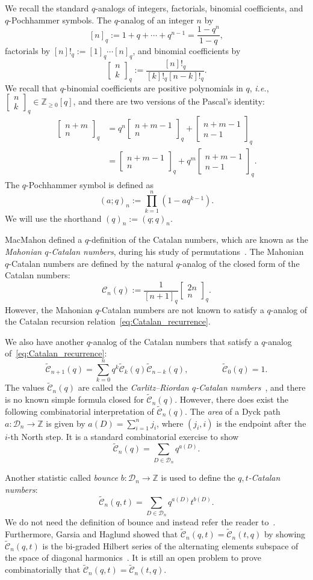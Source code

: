 \documentclass[11pt, leqno]{amsart}
\theoremstyle{plain}
\theoremstyle{definition}
\numberwithin{equation}{section}
\newcommand{\seteq}{\mathbin{:=}}
\newcommand{\Cat}{\mathcal{C}} %
\newcommand{\CatCR}{\widetilde{\Cat}} %
\newcommand{\Dyck}{\mathcal{D}} %
\newcommand{\qbinom}[3]{\left[ \begin{matrix} #1 \\ #2 \end{matrix} \right]_{#3}} %
\newcommand{\Z}{\mathbb{Z}}
\newcommand{\defn}[1]{{\color{darkred}\emph{#1}}} %
\begin{document}
We recall the standard $q$-analogs of integers, factorials, binomial coefficients, and $q$-Pochhammer symbols. The $q$-analog of an integer $n$ by
\[
[n]_q \seteq 1 + q + \cdots + q^{n-1} = \frac{1-q^n}{1-q},
\]
factorials by $[n]!_q \seteq [1]_q \cdots [n]_q$, and binomial coefficients by
\[
\qbinom{n}{k}{q} \seteq \frac{[n]!_q}{[k]!_q [n-k]!_q}.
\]
We recall that $q$-binomial coefficients are positive polynomials in $q$, \textit{i.e.}, $\qbinom{n}{k}{q} \in \Z_{\geq 0}[q]$, and there are two versions of the Pascal's identity:
\begin{subequations}
\label{eq:q_pascal}
\begin{align}
\label{eq:pascal1} \qbinom{n+m}{n}{q} & = q^n \qbinom{n+m-1}{n}{q} + \qbinom{n+m-1}{n-1}{q}
\\ \label{eq:pascal2} & = \qbinom{n+m-1}{n}{q} + q^m \qbinom{n+m-1}{n-1}{q}.
\end{align}
\end{subequations}
The $q$-Pochhammer symbol is defined as
\[
(a; q)_n \seteq \prod_{k=1}^n (1 - aq^{k-1}).
\]
We will use the shorthand $(q)_n \seteq (q;q)_n$.

MacMahon defined a $q$-definition of the Catalan numbers, which are known as the \defn{Mahonian $q$-Catalan numbers}, during his study of permutations~\cite{MacMahon15}. The Mahonian $q$-Catalan numbers are defined by the natural $q$-analog of the closed form of the Catalan numbers:
\[
\Cat_n(q) \seteq \frac{1}{[n+1]_q} \qbinom{2n}{n}{q}.
\]
However, the Mahonian $q$-Catalan numbers are not known to satisfy a $q$-analog of the Catalan recursion relation~\eqref{eq:Catalan_recurrence}.

We also have another $q$-analog of the Catalan numbers that satisfy a $q$-analog of~\eqref{eq:Catalan_recurrence}:
\[
\CatCR_{n+1}(q) = \sum_{k=0}^n q^k \CatCR_k(q) \CatCR_{n-k}(q),
\qquad
\qquad
\CatCR_0(q) = 1.
\]
The values $\CatCR_n(q)$ are called the \defn{Carlitz--Riordan $q$-Catalan numbers}~\cite{CR64}, and there is no known simple formula closed for $\CatCR_n(q)$. However, there does exist the following combinatorial interpretation of $\CatCR_n(q)$.
The \defn{area} of a Dyck path $a \colon \Dyck_n \to \Z$ is given by $a(D) = \sum_{i=1}^n j_i$, where $(j_i, i)$ is the endpoint after the $i$-th North step. It is a standard combinatorial exercise to show
\[
\CatCR_n(q) = \sum_{D \in \Dyck_n} q^{a(D)}.
\]

Another statistic called \defn{bounce} $b \colon \Dyck_n \to \Z$ is used to define the \defn{$q,t$-Catalan numbers}:
\[
\CatCR_n(q,t) = \sum_{D \in \Dyck_n} q^{a(D)} t^{b(D)}.
\]
We do not need the definition of bounce and instead refer the reader to~\cite{GH01,GH02}. Furthermore, Garsia and Haglund showed that $\CatCR_n(q,t) = \CatCR_n(t,q)$ by showing $\CatCR_n(q,t)$ is the bi-graded Hilbert series of the alternating elements subspace of the space of diagonal harmonics~\cite{GH01,GH02}. It is still an open problem to prove combinatorially that $\CatCR_n(q,t) = \CatCR_n(t,q)$.
\end{document}
